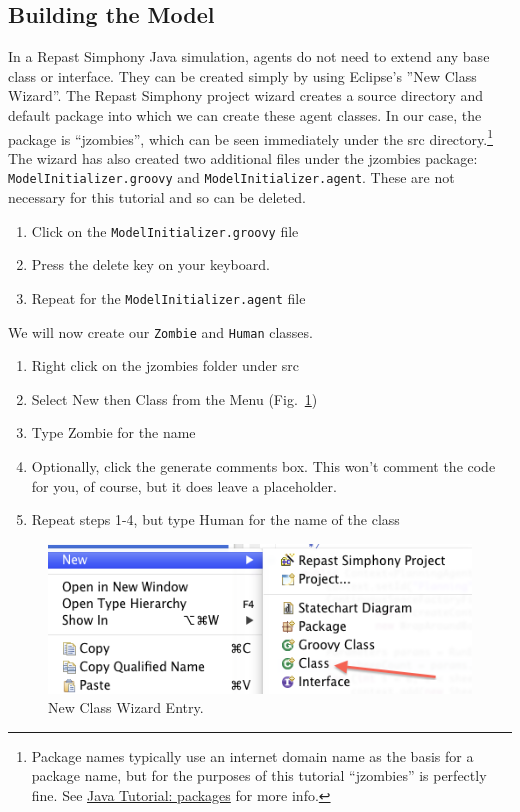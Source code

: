 \documentclass[11pt]{amsart}
\begin{document}
\subsection{Building the Model}
In a Repast Simphony Java simulation, agents do not need to extend any base class or interface. They can be created simply by using Eclipse's ''New Class Wizard''. The Repast Simphony project wizard creates a source directory and default package into which we can create these agent classes. In our case, the package is ``jzombies'', which can be seen immediately under the src directory.\footnote{Package names typically use an internet domain name as the basis for a package name, but for the purposes of this tutorial ``jzombies'' is perfectly fine. See  \href{http://download.oracle.com/javase/tutorial/java/package/namingpkgs.html}{Java Tutorial: packages} for more info.} The wizard has also created two additional files under the jzombies package: \texttt{ModelInitializer.groovy} and \texttt{ModelInitializer.agent}. These are not necessary for this tutorial and so can be deleted.

\vspace{.2in}
\begin{enumerate}
\item Click on the  \texttt{ModelInitializer.groovy} file
\item Press the delete key on your keyboard. 
\item Repeat for the \texttt{ModelInitializer.agent} file
\end{enumerate}

\vspace{.2in}
We will now create our \texttt{Zombie} and \texttt{Human} classes.
\begin{enumerate}
\item Right click on the jzombies folder under src
\item  Select New then Class from the Menu (Fig.~\ref{fig:class_wizard})
\item Type Zombie for the name
\item Optionally, click the generate comments box. This won't comment the code for you, of course, but it does
leave a placeholder.
\item Repeat steps 1-4, but type Human for the name of the class
\end{enumerate}

\begin{figure}[h]
\begin{center}
\vspace{.2in}
\centerline {
\includegraphics[width=5in]{GettingStartedImages/class_wizard.png}
}
\caption{New Class Wizard Entry.}
\label{fig:class_wizard}
\end{center}
\end{figure}
\end{document}
